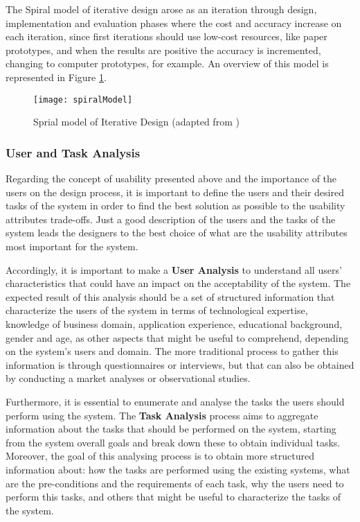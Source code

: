 The Spiral model of iterative design arose as an iteration through design, implementation and evaluation phases where the cost and accuracy increase on each iteration, since first iterations should use low-cost resources, like paper prototypes, and when the results are positive the accuracy is incremented, changing to computer prototypes, for example. \cite{interactionDesign_beyondHumanComputerInteraction} An overview of this model is represented in  Figure \ref{fig:spiralModel}.

\begin{figure}[htbp]
	\centering
	\texttt{[image: spiralModel]}
	\caption{Sprial model of Iterative Design (adapted from \cite{interactionDesign_beyondHumanComputerInteraction})}
	\label{fig:spiralModel}
\end{figure}

\subsubsection{User and Task Analysis}
\label{subsubsec:user_and_task_analysis}
Regarding the concept of usability presented above and the importance of the users on the design process, it is important to define the users and their desired tasks of the system in order to find the best solution as possible to the usability attributes trade-offs. Just a good description of the users and the tasks of the system leads the designers to the best choice of what are the usability attributes most important for the system.

Accordingly, it is important to make a \textbf{User Analysis} to understand all users’ characteristics that could have an impact on the acceptability of the system. The expected result of this analysis should be a set of structured information that characterize the users of the system in terms of technological expertise, knowledge of business domain, application experience, educational background, gender and age, as other aspects that might be useful to comprehend, depending on the system’s users and domain. \cite{userAnalysisInHCI_theHistoricalLessonFromIndividualDifferencesResearch} The more traditional process to gather this information is through questionnaires or interviews, but that can also be obtained by conducting a market analyses or observational studies. \cite{usabilityEngineering}

Furthermore, it is essential to enumerate and analyse the tasks the users should perform using the system. The \textbf{Task Analysis} process aims to aggregate information about the tasks that should be performed on the system, starting from the system overall goals and break down these to obtain individual tasks. \cite{usabilityEngineering} Moreover, the goal of this analysing process is to obtain more structured information about: how the tasks are performed using the existing systems, what are the pre-conditions and the requirements of each task, why the users need to perform this tasks, and others that might be useful to characterize the tasks of the system. 

